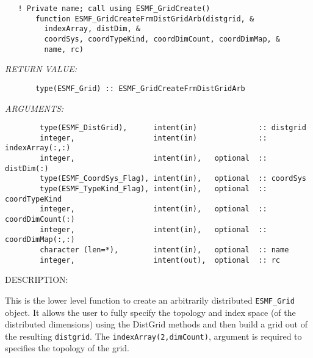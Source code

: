  
\begin{verbatim}   ! Private name; call using ESMF_GridCreate()
       function ESMF_GridCreateFrmDistGridArb(distgrid, &
         indexArray, distDim, &
         coordSys, coordTypeKind, coordDimCount, coordDimMap, &
         name, rc)\end{verbatim}{\em RETURN VALUE:}
\begin{verbatim}       type(ESMF_Grid) :: ESMF_GridCreateFrmDistGridArb\end{verbatim}{\em ARGUMENTS:}
\begin{verbatim}        type(ESMF_DistGrid),      intent(in)              :: distgrid
        integer,                  intent(in)              :: indexArray(:,:)
        integer,                  intent(in),   optional  :: distDim(:)
        type(ESMF_CoordSys_Flag), intent(in),   optional  :: coordSys
        type(ESMF_TypeKind_Flag), intent(in),   optional  :: coordTypeKind
        integer,                  intent(in),   optional  :: coordDimCount(:)
        integer,                  intent(in),   optional  :: coordDimMap(:,:)
        character (len=*),        intent(in),   optional  :: name
        integer,                  intent(out),  optional  :: rc\end{verbatim}
{\sf DESCRIPTION:\\ }


   This is the lower level function to create an arbitrarily distributed {\tt ESMF\_Grid}
   object. It allows the user to fully specify the topology and index space
   (of the distributed dimensions) using the DistGrid methods and then build a grid out
   of the resulting {\tt distgrid}.  The {\tt indexArray(2,dimCount)},
   argument is required to specifies the topology of the grid.
  
